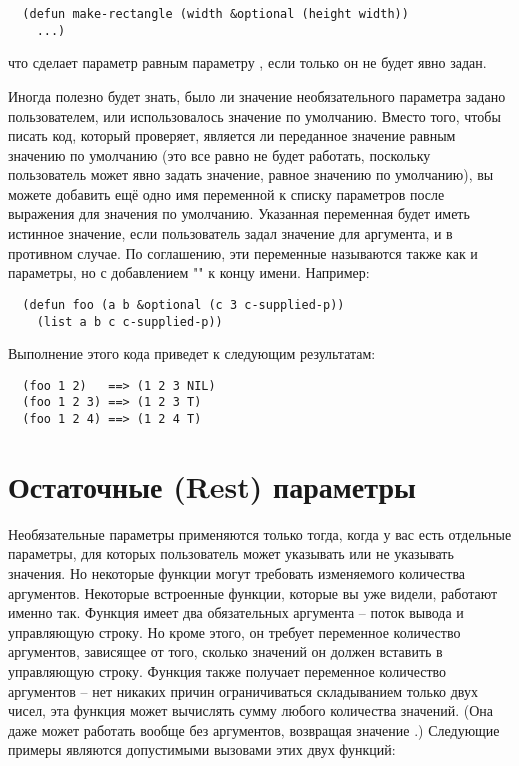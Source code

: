 \begin{lstlisting}
  (defun make-rectangle (width &optional (height width)) 
    ...)
\end{lstlisting}

что сделает параметр  равным параметру , если только он не будет
явно задан.

Иногда полезно будет знать, было ли значение необязательного параметра задано
пользователем, или использовалось значение по умолчанию.  Вместо того, чтобы писать код,
который проверяет, является ли переданное значение равным значению по умолчанию (это все
равно не будет работать, поскольку пользователь может явно задать значение, равное
значению по умолчанию), вы можете добавить ещё одно имя переменной к списку параметров
после выражения для значения по умолчанию.  Указанная переменная будет иметь истинное
значение, если пользователь задал значение для аргумента, и  в противном случае.
По соглашению, эти переменные называются также как и параметры, но с добавлением
"" к концу имени. Например:

\begin{lstlisting}
  (defun foo (a b &optional (c 3 c-supplied-p))
    (list a b c c-supplied-p))
\end{lstlisting}

Выполнение этого кода приведет к следующим результатам:

\begin{verbatim}
  (foo 1 2)   ==> (1 2 3 NIL)
  (foo 1 2 3) ==> (1 2 3 T)
  (foo 1 2 4) ==> (1 2 4 T)
\end{verbatim}

\section{Остаточные (Rest) параметры}

Необязательные параметры применяются только тогда, когда у вас есть отдельные параметры,
для которых пользователь может указывать или не указывать значения.  Но некоторые функции
могут требовать изменяемого количества аргументов.  Некоторые встроенные функции, которые
вы уже видели, работают именно так.  Функция  имеет два обязательных
аргумента -- поток вывода и управляющую строку.  Но кроме этого, он требует переменное
количество аргументов, зависящее от того, сколько значений он должен вставить в
управляющую строку.  Функция \code{+} также получает переменное количество аргументов --
нет никаких причин ограничиваться складыванием только двух чисел, эта функция может
вычислять сумму любого количества значений. (Она даже может работать вообще без
аргументов, возвращая значение .)  Следующие примеры являются допустимыми вызовами
этих двух функций:

